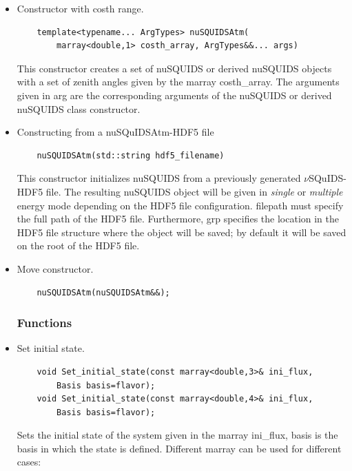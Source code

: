 \documentclass[3p,12pt]{elsarticle}
\newcommand{\ttf}{\ttfamily}
\begin{document}
\begin{itemize}
\item Constructor with {\ttf costh} range.
  \begin{lstlisting}
    template<typename... ArgTypes> nuSQUIDSAtm(
        marray<double,1> costh_array, ArgTypes&&... args)
  \end{lstlisting}
This constructor creates a set of {\ttf nuSQUIDS} or derived {\ttf
  nuSQUIDS} objects with a set of zenith angles given by the {\ttf
  marray} {\ttf costh\_array}. The arguments given in {\ttf arg} are the
corresponding arguments of the nuSQUIDS or derived nuSQUIDS class constructor.

\item Constructing from a nuSQuIDSAtm-HDF5 file
  \begin{lstlisting}
    nuSQUIDSAtm(std::string hdf5_filename)
  \end{lstlisting}
This constructor initializes {\ttfamily nuSQUIDS} from a 
previously generated $\nu$SQuIDS-HDF5 file. The resulting {\ttfamily nuSQUIDS} 
object will be given in {\it single} or {\it multiple} energy mode
depending on the HDF5 file configuration. {\ttfamily filepath} must specify the full
path of the HDF5 file. Furthermore,
{\ttfamily grp} specifies the location in the HDF5 file structure
where the object will be saved; by default
it will be saved on the {\ttfamily root} of the HDF5 file.

\item Move constructor.
  \begin{lstlisting}
    nuSQUIDSAtm(nuSQUIDSAtm&&);
  \end{lstlisting}

  \subsubsection{Functions}
\item Set initial state.
  \begin{lstlisting}
    void Set_initial_state(const marray<double,3>& ini_flux,
        Basis basis=flavor);
    void Set_initial_state(const marray<double,4>& ini_flux,
        Basis basis=flavor);
  \end{lstlisting}
  Sets the initial state of the system given in the marray {\ttf
    ini\_flux}, {\ttf basis} is the basis in which the state is
  defined. Different {\ttf marray} can be used for different cases:


\end{itemize}
\end{document}
